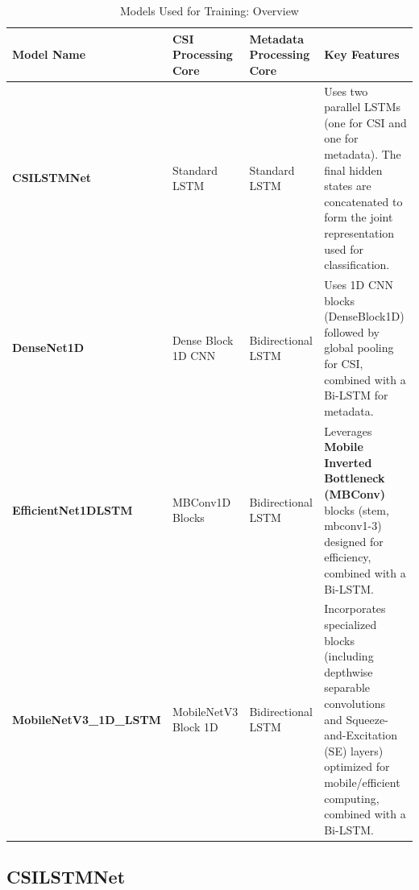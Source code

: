 \begin{table}[H]
\scriptsize
\centering
\caption{Models Used for Training: Overview}
\label{tab:Table4_1}

\begin{tabular}{
    | p{3.5cm}     %
    | p{3cm}     %
    | p{3cm}     %
    | p{5cm}     %
|}
\hline
\textbf{Model Name} &
\textbf{CSI Processing Core} &
\textbf{Metadata Processing Core} &
\textbf{Key Features} \\
\hline

\textbf{CSILSTMNet} &
Standard LSTM &
Standard LSTM &
Uses two parallel LSTMs (one for CSI and one for metadata).  
The final hidden states are concatenated to form the joint representation used for classification. \\
\hline

\textbf{DenseNet1D} &
Dense Block 1D CNN &
Bidirectional LSTM &
Uses 1D CNN blocks (DenseBlock1D) followed by global pooling for CSI, combined with a Bi-LSTM for metadata.
\\
\hline


\textbf{EfficientNet1DLSTM} &
MBConv1D Blocks &
Bidirectional LSTM &
Leverages \textbf{Mobile Inverted Bottleneck (MBConv)} blocks (stem, mbconv1-3) designed for efficiency, combined with a Bi-LSTM.\\
\hline

\textbf{MobileNetV3\_1D\_LSTM} &
MobileNetV3 Block 1D &
Bidirectional LSTM &
Incorporates specialized blocks (including depthwise separable convolutions and Squeeze-and-Excitation (SE) layers) optimized for mobile/efficient computing, combined with a Bi-LSTM.\\
\hline

\end{tabular}

\end{table}



\subsection{CSILSTMNet}

